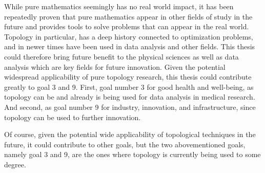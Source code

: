 While pure mathematics seemingly has no real world impact, it has been repeatedly proven that pure mathematics appear in other fields of study in the future and provides tools to solve problems that can appear in the real world. Topology in particular, has a deep history connected to optimization problems, and in newer times have been used in data analysis and other fields. This thesis could therefore bring future benefit to the physical sciences as well as data analysis which are key fields for future innovation. Given the potential widespread applicability of pure topology research, this thesis could contribute greatly to goal 3 and 9. First, goal number 3 for good health and well-being, as topology can be and already is being used for data analysis in medical research. And second, as goal number 9 for industry, innovation, and infrastructure, since topology can be used to further innovation.

Of course, given the potential wide applicability of topological techniques in the future, it could contribute to other goals, but the two abovementioned goals, namely goal 3 and 9, are the ones where topology is currently being used to some degree.

